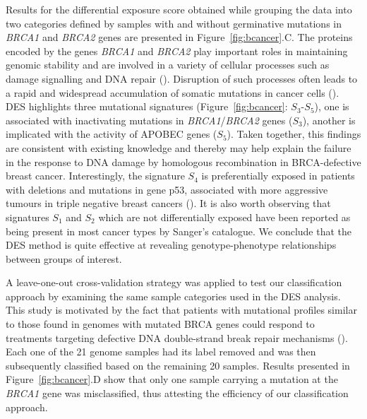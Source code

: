 \documentclass{bioinfo}
\begin{document}
Results for the differential exposure score obtained while grouping
the data into two categories defined by samples with and without
germinative mutations in \emph{BRCA1} and \emph{BRCA2} genes are
presented in Figure~\ref{fig:bcancer}.C. The proteins encoded by the
genes \emph{BRCA1} and \emph{BRCA2} play important roles in
maintaining genomic stability and are involved in a variety of
cellular processes such as damage signalling and DNA repair
(\citealp{LY}). Disruption of such processes often leads to a rapid
and widespread accumulation of somatic mutations in cancer cells
(\citealp{Ash}). DES highlights three mutational signatures
(Figure~\ref{fig:bcancer}: $S_3$-$S_5$), one is associated with
inactivating mutations in \emph{BRCA1}/\emph{BRCA2} genes ($S_{3}$),
another is implicated with the activity of APOBEC genes ($S_5$). Taken
together, this findings are consistent with existing knowledge and
thereby may help explain the failure in the response to DNA damage by
homologous recombination in BRCA-defective breast
cancer. Interestingly, the signature $S_4$ is preferentially exposed
in patients with deletions and mutations in gene p53, associated with
more aggressive tumours in triple negative breast cancers
(\citealp{DP}). It is also worth observing that signatures $S_1$ and
$S_2$ which are not differentially exposed have been reported as being
present in most cancer types by Sanger's catalogue. We conclude that
the DES method is quite effective at revealing genotype-phenotype
relationships between groups of interest.

A leave-one-out cross-validation strategy was applied to test our
classification approach by examining the same sample categories used
in the DES analysis. This study is motivated by the fact that patients
with mutational profiles similar to those found in genomes with
mutated BRCA genes could respond to treatments targeting defective DNA
double-strand break repair mechanisms (\citealp{Ash}).  Each one of
the 21 genome samples had its label removed and was then subsequently
classified based on the remaining 20 samples.  Results presented in
Figure~\ref{fig:bcancer}.D show that only one sample carrying a
mutation at the \emph{BRCA1} gene was misclassified, thus attesting
the efficiency of our classification approach.
\end{document}
